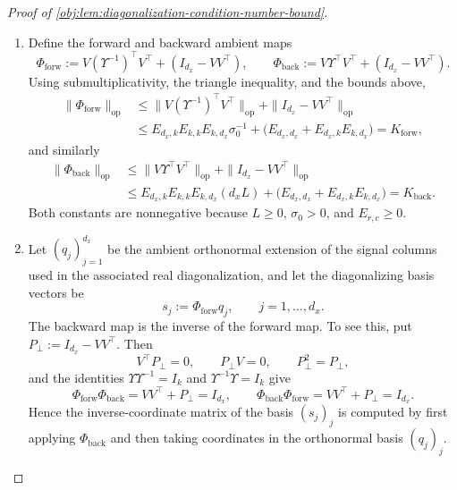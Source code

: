 \documentclass[11pt]{article}
\begin{document}
\begin{proof}[Proof of \cref{obj:lem:diagonalization-condition-number-bound}]
\begin{enumerate}
\item Define the forward and backward ambient maps
\[
\Phi_{\mathrm{forw}}
:=
V(\Upsilon^{-1})^\top V^\top+(I_{d_x}-VV^\top),
\qquad
\Phi_{\mathrm{back}}
:=
V\Upsilon^\top V^\top+(I_{d_x}-VV^\top).
\]
Using submultiplicativity, the triangle inequality, and the bounds above,
\[
\begin{aligned}
\|\Phi_{\mathrm{forw}}\|_{\mathrm{op}}
&\le
\|V(\Upsilon^{-1})^\top V^\top\|_{\mathrm{op}}
+
\|I_{d_x}-VV^\top\|_{\mathrm{op}}\\
&\le
E_{d_x,k}E_{k,k}E_{k,d_x}\sigma_0^{-1}
+
\bigl(E_{d_x,d_x}+E_{d_x,k}E_{k,d_x}\bigr)
=
K_{\mathrm{forw}},
\end{aligned}
\]
and similarly
\[
\begin{aligned}
\|\Phi_{\mathrm{back}}\|_{\mathrm{op}}
&\le
\|V\Upsilon^\top V^\top\|_{\mathrm{op}}
+
\|I_{d_x}-VV^\top\|_{\mathrm{op}}\\
&\le
E_{d_x,k}E_{k,k}E_{k,d_x}(d_xL)
+
\bigl(E_{d_x,d_x}+E_{d_x,k}E_{k,d_x}\bigr)
=
K_{\mathrm{back}} .
\end{aligned}
\]
Both constants are nonnegative because \(L\ge0\), \(\sigma_0>0\), and \(E_{r,c}\ge0\). %

\item Let \((q_j)_{j=1}^{d_x}\) be the ambient orthonormal extension of the signal columns used in the associated real diagonalization, and let the diagonalizing basis vectors be
\[
s_j:=\Phi_{\mathrm{forw}}q_j,\qquad j=1,\ldots,d_x .
\]
The backward map is the inverse of the forward map. To see this, put \(P_\perp:=I_{d_x}-VV^\top\). Then
\[
V^\top P_\perp=0,\qquad P_\perp V=0,\qquad P_\perp^2=P_\perp,
\]
and the identities \(\Upsilon\Upsilon^{-1}=I_k\) and \(\Upsilon^{-1}\Upsilon=I_k\) give
\[
\Phi_{\mathrm{forw}}\Phi_{\mathrm{back}}
=
VV^\top+P_\perp
=
I_{d_x},
\qquad
\Phi_{\mathrm{back}}\Phi_{\mathrm{forw}}
=
VV^\top+P_\perp
=
I_{d_x}.
\]
Hence the inverse-coordinate matrix of the basis \((s_j)_j\) is computed by first applying \(\Phi_{\mathrm{back}}\) and then taking coordinates in the orthonormal basis \((q_j)_j\). %


\end{enumerate}
\end{proof}
\end{document}

